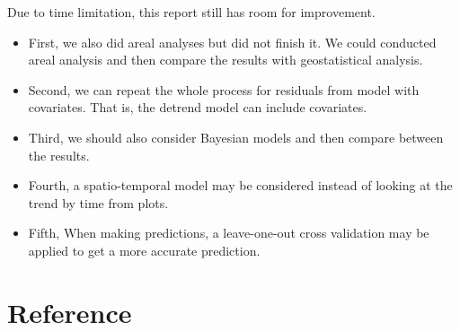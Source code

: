 \documentclass[hidelinks,12pt]{article}
\begin{document}
	Due to time limitation, this report still has room for improvement.
	\begin{itemize}
		\item First, we also did areal analyses but did not finish it. We could conducted areal analysis and then compare the results with geostatistical analysis.
		\item Second, we can repeat the whole process for residuals from model with covariates. That is, the detrend model can include covariates.
		\item Third, we should also consider Bayesian models and then compare between the results.
		\item Fourth, a spatio-temporal model may be considered instead of looking at the trend by time from plots.
		\item Fifth, When making predictions, a leave-one-out cross validation may be applied to get a more accurate prediction.
	\end{itemize}
	
	\section{Reference}\label{sec:ref}
	
	
	\clearpage
	\appendix
\end{document}
